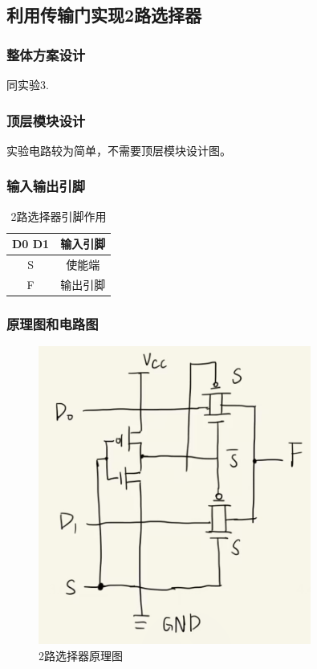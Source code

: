 \documentclass{article}
\begin{document}
    \subsection{利用传输门实现2路选择器}

    \subsubsection{整体方案设计}
    同实验3.
    
    \subsubsection{顶层模块设计}
    实验电路较为简单，不需要顶层模块设计图。

    \subsubsection{输入输出引脚}
    \begin{table}[H]
    \centering
    \begin{tabular}{|c|c|}
        \hline
        D0 D1 & 输入引脚 \\ \hline
        S & 使能端 \\ \hline 
        F   & 输出引脚 \\ \hline
    \end{tabular}
    \caption{2路选择器引脚作用}
    \end{table}

    \subsubsection{原理图和电路图}
    \begin{figure}[H]
    \centering
    \includegraphics[width=0.8\textwidth]{4.4.1.png}
    \caption{2路选择器原理图}
    \end{figure}
\end{document}
